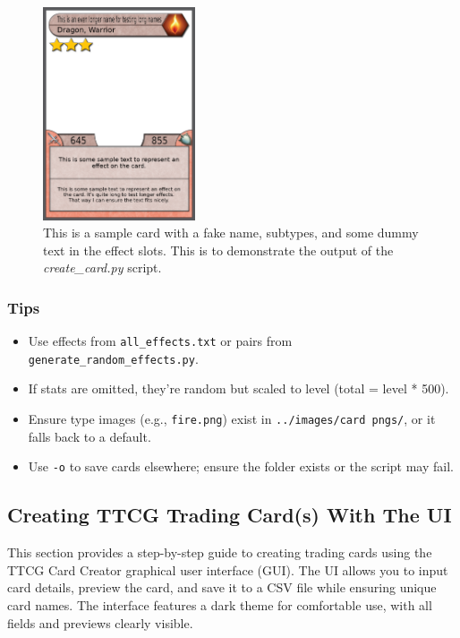 \begin{figure}[h]
	\centering
	\includegraphics[width=0.4\textwidth]{images/sample_generated_output.png} 
	\caption{This is a sample card with a fake name, subtypes, and some dummy text in the effect slots. This is to demonstrate the output of the \textit{create\_card.py} script.}
	\label{fig:sample_generated_output}
\end{figure}

\subsubsection{Tips}
\begin{itemize}
	\item Use effects from \texttt{all\_effects.txt} or pairs from \texttt{generate\_random\_effects.py}.
	\item If stats are omitted, they’re random but scaled to level (total = level * 500).
	\item Ensure type images (e.g., \texttt{fire.png}) exist in \texttt{../images/card pngs/}, or it falls back to a default.
	\item Use \texttt{-o} to save cards elsewhere; ensure the folder exists or the script may fail.
\end{itemize}










\subsection{Creating TTCG Trading Card(s) With The UI}

This section provides a step-by-step guide to creating trading cards using the TTCG Card Creator graphical user interface (GUI). The UI allows you to input card details, preview the card, and save it to a CSV file while ensuring unique card names. The interface features a dark theme for comfortable use, with all fields and previews clearly visible.

